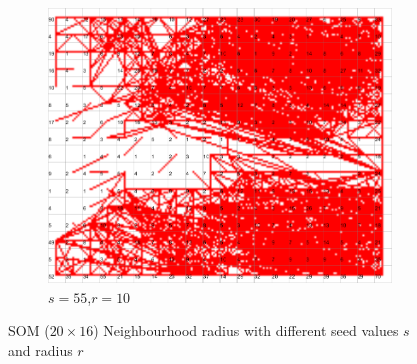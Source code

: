 \documentclass{acm_proc_article-sp}
\begin{document}
\begin{figure}
    \begin{subfigure}[b]{0.30\linewidth}
        \includegraphics[width=\linewidth]{img/wine-newmid-radius-neighbourhood-graph--r-10-seed-55}
        \caption{$s=55$,$r=10$}
    \end{subfigure}
    \caption{SOM ($20\times16$) Neighbourhood radius with different seed values $s$ and radius $r$}
    \label{fig:wine-newmid-radius-neighbourhood-graph--r-10-seed}
\end{figure}
\end{document}

